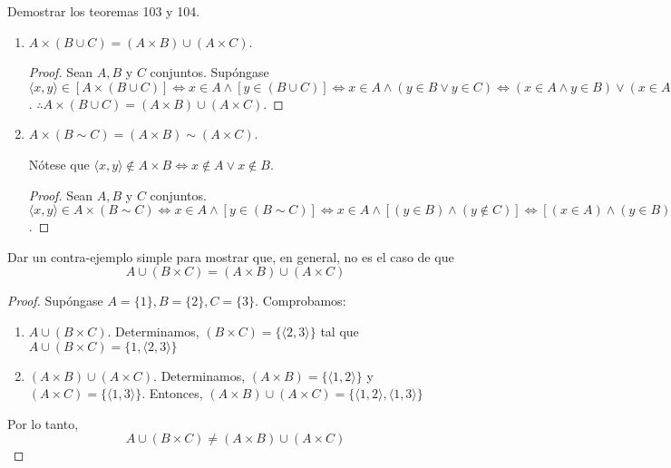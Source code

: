 \begin{problema}
	Demostrar los teoremas 103  y 104.
	\begin{enumerate}
		\item[103.] $A\times (B\cup C)=(A\times B)\cup (A\times C)$.
		\begin{proof}
			Sean $A,B$ y $C$ conjuntos. Supóngase $\langle x, y\rangle \in \left[A\times (B\cup C)\right]\iff x\in A\wedge [y\in (B\cup C)]\iff x\in A \wedge (y\in B\vee y\in C)\iff (x\in A\wedge y\in B)\vee(x\in A\wedge y\in C)\iff \langle x, y \rangle \in (A\times B)\cup (A\times C)$. $\therefore A\times (B\cup C)=(A\times B)\cup (A\times C)$.  
		\end{proof}
		\item[104.] $A\times (B \sim C)= (A\times B)\sim (A\times C)$.
			\begin{cajita}
			Nótese que $\langle x,y \rangle \not\in A\times B \iff x\not\in A \vee x\not\in B  $.
		\end{cajita}
	\begin{proof}
			Sean $A,B$ y $C$ conjuntos. $\langle x, y\rangle \in A\times (B\sim C)\iff x\in A \wedge \left[y\in (B\sim C)\right]\iff x\in A \wedge [(y\in B)\wedge (y\not\in C)]\iff [(x\in A) \wedge (y\in B)] \wedge  ( y\not\in C)\iff \langle x, y\rangle \in (A\times B)\sim (A\times C) $. 
	\end{proof}
	\end{enumerate}
\end{problema}


\begin{problema}
	Dar un contra-ejemplo simple para mostrar que, en general, no es el caso de que
	$$
	A \cup(B \times C)=(A \times B) \cup(A \times C)
	$$
\end{problema}
\begin{proof}
	Supóngase $A=\{1\}, B=\{2\}, C=\{3\}$. Comprobamos:
	\begin{enumerate}
		\item $A \cup(B \times C)$.  Determinamos, $(B\times C)=\{\langle 2,3\rangle\}$ tal que $A \cup(B \times C)=\{1,\langle 2,3\rangle \}$
		\item $(A \times B) \cup(A \times C)$. Determinamos, $(A \times B) = \{\langle 1, 2\rangle \}$ y $(A\times C)=\{\langle 1, 3\rangle\}$. Entonces, $(A \times B) \cup(A \times C)= \{\langle 1, 2\rangle, \langle 1, 3\rangle \}$
	\end{enumerate}
	Por lo tanto, $$
	A \cup(B \times C)\neq (A \times B) \cup(A \times C)
	$$
\end{proof}

